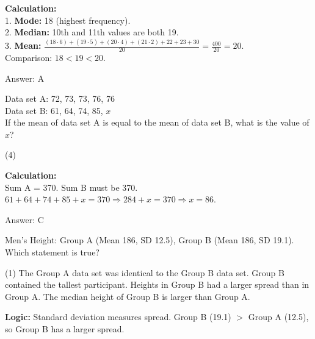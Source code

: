 \documentclass[11pt,paper=a4,answers]{exam}
\begin{document}
\begin{questions}
\begin{solution}
\textbf{Calculation:} \\
1. \textbf{Mode:} 18 (highest frequency). \\
2. \textbf{Median:} 10th and 11th values are both 19. \\
3. \textbf{Mean:} $\frac{(18\cdot6)+(19\cdot5)+(20\cdot4)+(21\cdot2)+22+23+30}{20} = \frac{400}{20} = 20$. \\
Comparison: $18 < 19 < 20$.

\vspace{30pt}

Answer: \colorbox{yellow!100}{A}
\end{solution}

\vspace{60pt}

\question
Data set A: 72, 73, 73, 76, 76 \\
Data set B: 61, 64, 74, 85, $x$ \\
If the mean of data set A is equal to the mean of data set B, what is the value of $x$?
\begin{tasks}(4)
\end{tasks}

\begin{solution}
\textbf{Calculation:} \\
Sum A = 370. Sum B must be 370. \\
$61+64+74+85+x = 370 \Rightarrow 284+x=370 \Rightarrow x=86$.

\vspace{30pt}

Answer: \colorbox{yellow!100}{C}
\end{solution}

\vspace{60pt}

\question
Men's Height: Group A (Mean 186, SD 12.5), Group B (Mean 186, SD 19.1). Which statement is true?
\begin{tasks}(1)
    \task The Group A data set was identical to the Group B data set.
    \task Group B contained the tallest participant.
    \task Heights in Group B had a larger spread than in Group A.
    \task The median height of Group B is larger than Group A.
\end{tasks}

\begin{solution}
\textbf{Logic:} Standard deviation measures spread. Group B (19.1) $>$ Group A (12.5), so Group B has a larger spread.


\end{solution}
\end{questions}
\end{document}
